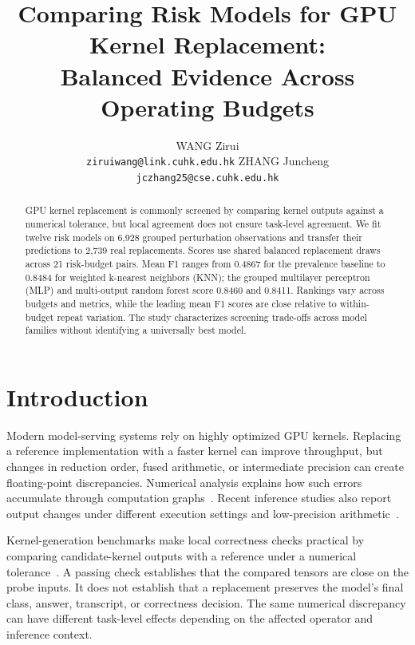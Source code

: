 \documentclass{article}
\title{Comparing Risk Models for GPU Kernel Replacement:\\
Balanced Evidence Across Operating Budgets}
\author{%
  WANG Zirui \\
  \texttt{ziruiwang@link.cuhk.edu.hk}
  \And
  ZHANG Juncheng \\
  \texttt{jczhang25@cse.cuhk.edu.hk}
}
\begin{document}
\maketitle

\begin{abstract}
GPU kernel replacement is commonly screened by comparing kernel outputs against a numerical tolerance, but local agreement does not ensure task-level agreement. We fit twelve risk models on 6,928 grouped perturbation observations and transfer their predictions to 2,739 real replacements. Scores use shared balanced replacement draws across 21 risk-budget pairs. Mean F1 ranges from 0.4867 for the prevalence baseline to 0.8484 for weighted k-nearest neighbors (KNN); the grouped multilayer perceptron (MLP) and multi-output random forest score 0.8460 and 0.8411. Rankings vary across budgets and metrics, while the leading mean F1 scores are close relative to within-budget repeat variation. The study characterizes screening trade-offs across model families without identifying a universally best model.

\end{abstract}

\section{Introduction}

Modern model-serving systems rely on highly optimized GPU kernels. Replacing a reference implementation with a faster kernel can improve throughput, but changes in reduction order, fused arithmetic, or intermediate precision can create floating-point discrepancies. Numerical analysis explains how such errors accumulate through computation graphs~\citep{higham2002accuracy,sharif2019approxhpvm,jiang2023arbitor}. Recent inference studies also report output changes under different execution settings and low-precision arithmetic~\citep{yuan2025nondeterminism,shah2024flashattention3}.

Kernel-generation benchmarks make local correctness checks practical by comparing candidate-kernel outputs with a reference under a numerical tolerance~\citep{ouyang2025kernelbench,li2025tritonbench}. A passing check establishes that the compared tensors are close on the probe inputs. It does not establish that a replacement preserves the model's final class, answer, transcript, or correctness decision. The same numerical discrepancy can have different task-level effects depending on the affected operator and inference context.
\end{document}
